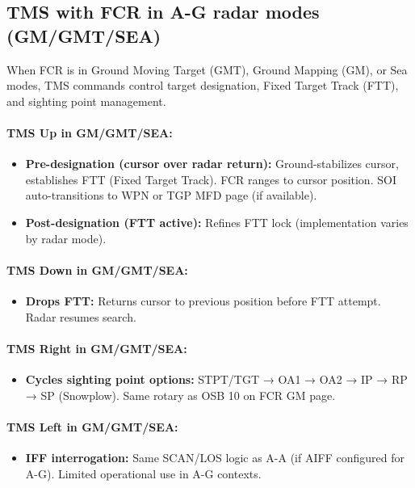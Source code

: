 \documentclass[11pt, a4paper, twoside]{report}
\begin{document}
\subsection{TMS with FCR in A-G radar modes (GM/GMT/SEA)}
\label{sec:C4-S4-S1}

When FCR is in Ground Moving Target (GMT), Ground Mapping (GM), or Sea modes, TMS commands control target designation, Fixed Target Track (FTT), and sighting point management.

\paragraph{TMS Up in GM/GMT/SEA:}
\begin{itemize}
    \item \textbf{Pre-designation (cursor over radar return):} Ground-stabilizes cursor, establishes FTT (Fixed Target Track). FCR ranges to cursor position. SOI auto-transitions to WPN or TGP MFD page (if available).
    \item \textbf{Post-designation (FTT active):} Refines FTT lock (implementation varies by radar mode).
\end{itemize}

\paragraph{TMS Down in GM/GMT/SEA:}
\begin{itemize}
    \item \textbf{Drops FTT:} Returns cursor to previous position before FTT attempt. Radar resumes search.
\end{itemize}

\paragraph{TMS Right in GM/GMT/SEA:}
\begin{itemize}
    \item \textbf{Cycles sighting point options:} STPT/TGT → OA1 → OA2 → IP → RP → SP (Snowplow). Same rotary as OSB 10 on FCR GM page.
\end{itemize}

\paragraph{TMS Left in GM/GMT/SEA:}
\begin{itemize}
    \item \textbf{IFF interrogation:} Same SCAN/LOS logic as A-A (if AIFF configured for A-G). Limited operational use in A-G contexts.
\end{itemize}
\end{document}
